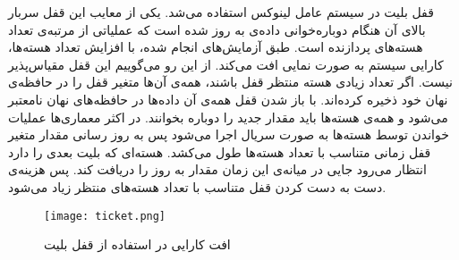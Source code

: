 قفل بلیت در سیستم عامل لینوکس استفاده می‌شد. یکی از معایب این قفل سربار بالای آن هنگام دوباره‌خوانی داده‌ی به روز شده است که عملیاتی از مرتبه‌ی تعداد هسته‌های پردازنده است. طبق آزمایش‌های انجام شده،‌ با افزایش تعداد هسته‌ها، کارایی سیستم به صورت نمایی افت می‌کند. از این رو می‌گوییم این قفل مقیاس‌پذیر 
نیست. اگر تعداد زیادی هسته منتظر قفل باشند، همه‌ی آن‌ها متغیر قفل را در حافظه‌ی نهان خود ذخیره کرده‌اند. با باز شدن قفل همه‌ی آن داده‌ها در حافظه‌های نهان نامعتبر می‌شود و همه‌ی هسته‌ها باید مقدار جدید را دوباره بخوانند. در اکثر معماری‌ها عملیات خواندن توسط هسته‌ها به صورت سریال اجرا می‌شود پس به روز رسانی مقدار متغیر قفل زمانی متناسب با تعداد هسته‌ها طول می‌کشد. هسته‌ای که بلیت بعدی را دارد انتظار می‌رود جایی در میانه‌ی این زمان مقدار به روز را دریافت کند. پس هزینه‌ی دست به دست کردن قفل متناسب با تعداد هسته‌های منتظر زیاد می‌شود.
\begin{figure}[H]
	\centering
	\texttt{[image: ticket.png]}
	\caption{افت کارایی در استفاده از قفل بلیت}
\end{figure}